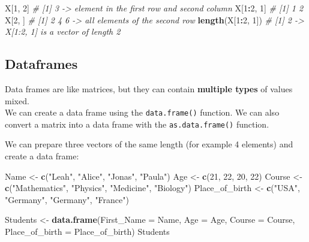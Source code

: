 \documentclass[
]{book}
\newenvironment{Shaded}{\begin{snugshade}}{\end{snugshade}}
\newcommand{\AttributeTok}[1]{\textcolor[rgb]{0.13,0.29,0.53}{#1}}
\newcommand{\CommentTok}[1]{\textcolor[rgb]{0.56,0.35,0.01}{\textit{#1}}}
\newcommand{\DecValTok}[1]{\textcolor[rgb]{0.00,0.00,0.81}{#1}}
\newcommand{\FunctionTok}[1]{\textcolor[rgb]{0.13,0.29,0.53}{\textbf{#1}}}
\newcommand{\NormalTok}[1]{#1}
\newcommand{\OtherTok}[1]{\textcolor[rgb]{0.56,0.35,0.01}{#1}}
\newcommand{\SpecialCharTok}[1]{\textcolor[rgb]{0.81,0.36,0.00}{\textbf{#1}}}
\newcommand{\StringTok}[1]{\textcolor[rgb]{0.31,0.60,0.02}{#1}}
\begin{document}
\begin{Shaded}
\begin{Highlighting}[]
\NormalTok{X[}\DecValTok{1}\NormalTok{, }\DecValTok{2}\NormalTok{]                     }\CommentTok{\# [1] 3  {-}\textgreater{} element in the first row and second column}
\NormalTok{X[}\DecValTok{1}\SpecialCharTok{:}\DecValTok{2}\NormalTok{, }\DecValTok{1}\NormalTok{]                     }\CommentTok{\# [1] 1 2 }
\NormalTok{X[}\DecValTok{2}\NormalTok{, ]                      }\CommentTok{\# [1] 2 4 6  {-}\textgreater{} all elements of the second row}
\FunctionTok{length}\NormalTok{(X[}\DecValTok{1}\SpecialCharTok{:}\DecValTok{2}\NormalTok{, }\DecValTok{1}\NormalTok{])             }\CommentTok{\# [1] 2  {-}\textgreater{} X[1:2, 1] is a vector of length 2}
\end{Highlighting}
\end{Shaded}

\hypertarget{dataframes}{%
\subsection*{Dataframes}\label{dataframes}}

Data frames are like matrices, but they can contain \textbf{multiple types} of values mixed.\\
We can create a data frame using the \texttt{data.frame()} function.
We can also convert a matrix into a data frame with the \texttt{as.data.frame()} function.

We can prepare three vectors of the same length (for example 4 elements) and create a data frame:

\begin{Shaded}
\begin{Highlighting}[]
\NormalTok{Name }\OtherTok{\textless{}{-}} \FunctionTok{c}\NormalTok{(}\StringTok{"Leah"}\NormalTok{, }\StringTok{"Alice"}\NormalTok{, }\StringTok{"Jonas"}\NormalTok{, }\StringTok{"Paula"}\NormalTok{)}
\NormalTok{Age }\OtherTok{\textless{}{-}} \FunctionTok{c}\NormalTok{(}\DecValTok{21}\NormalTok{, }\DecValTok{22}\NormalTok{, }\DecValTok{20}\NormalTok{, }\DecValTok{22}\NormalTok{)}
\NormalTok{Course }\OtherTok{\textless{}{-}} \FunctionTok{c}\NormalTok{(}\StringTok{"Mathematics"}\NormalTok{, }\StringTok{"Physics"}\NormalTok{, }\StringTok{"Medicine"}\NormalTok{, }\StringTok{"Biology"}\NormalTok{)}
\NormalTok{Place\_of\_birth }\OtherTok{\textless{}{-}} \FunctionTok{c}\NormalTok{(}\StringTok{"USA"}\NormalTok{, }\StringTok{"Germany"}\NormalTok{, }\StringTok{"Germany"}\NormalTok{, }\StringTok{"France"}\NormalTok{)}

\NormalTok{Students }\OtherTok{\textless{}{-}} \FunctionTok{data.frame}\NormalTok{(}\AttributeTok{First\_Name =}\NormalTok{ Name, }
                       \AttributeTok{Age =}\NormalTok{ Age, }
                       \AttributeTok{Course =}\NormalTok{ Course,}
                       \AttributeTok{Place\_of\_birth =}\NormalTok{ Place\_of\_birth)}
\NormalTok{Students}
\end{Highlighting}
\end{Shaded}
\end{document}
